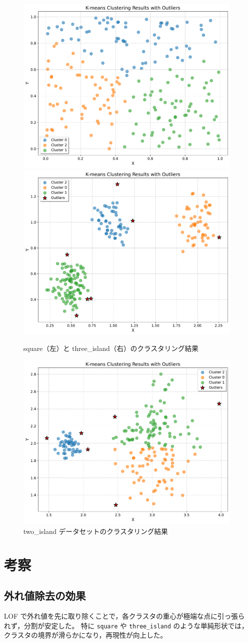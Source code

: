 \documentclass[a4j,dvipdfmx]{jsarticle}
\begin{document}
\begin{figure}[H] %
  \centering
  \includegraphics[width=.4\textwidth]{square_output_plot.pdf}
  \includegraphics[width=.4\textwidth]{three_island_output_plot.pdf}
  \caption{square（左）と three\_island（右）のクラスタリング結果}
  \label{fig:square-three}
\end{figure}

\begin{figure}[H] %
  \centering
  \includegraphics[width=.4\textwidth]{two_island_output_plot.pdf}
  \caption{two\_island データセットのクラスタリング結果}
  \label{fig:two-island}
\end{figure}

\section{考察}

\subsection*{外れ値除去の効果}
LOF で外れ値を先に取り除くことで，各クラスタの重心が極端な点に引っ張られず，分割が安定した。  
特に \texttt{square} や \texttt{three\_island} のような単純形状では，クラスタの境界が滑らかになり，再現性が向上した。
\end{document}
